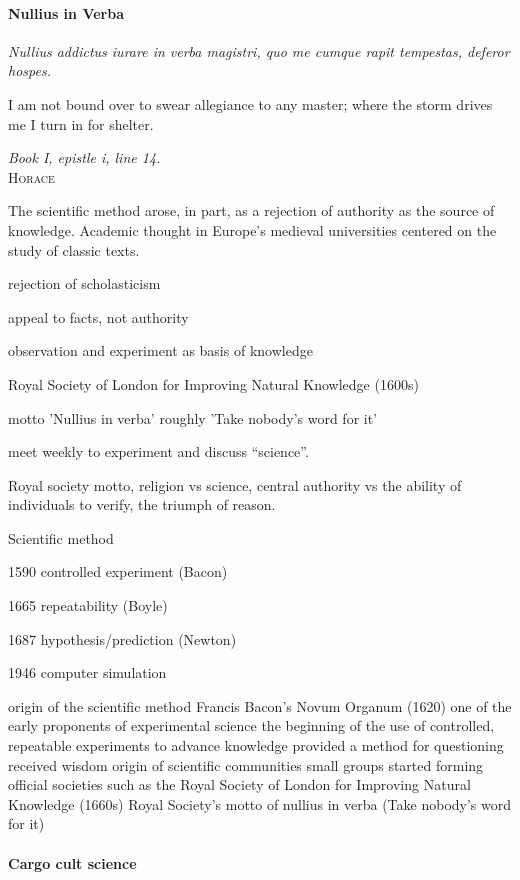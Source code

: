 \documentclass[ChapterTOCs,krantz2]{krantz} %
\begin{document}
\paragraph{ {\bf Nullius in Verba}} 

\setlength{\epigraphrule}{0pt}
\setlength{\epigraphwidth}{.65\textwidth}
\epigraph%
{%
  \emph{Nullius addictus iurare in verba magistri,
  quo me cumque rapit tempestas, deferor hospes.}

  I am not bound over to swear allegiance to any master; where the storm
  drives me I turn in for shelter.
}%
{\textit{Book I, epistle i, line 14.}\\ \textsc{Horace} }

The scientific method arose, in part, as a rejection of authority as
the source of knowledge. Academic thought in Europe's medieval universities
centered on the study of classic texts.

rejection of scholasticism

appeal to facts, not authority

observation and experiment as basis of knowledge

Royal Society of London for Improving Natural Knowledge (1600s)

motto 'Nullius in verba' roughly 'Take nobody's word for it'

meet weekly to experiment and discuss ``science''. 

Royal society motto, religion vs science, central authority vs the
ability of individuals to verify, the triumph of reason.

Scientific method

1590  controlled experiment (Bacon)

1665  repeatability (Boyle)

1687  hypothesis/prediction (Newton)

1946  computer simulation

    origin of the scientific method
        Francis Bacon's Novum Organum (1620) one of the early proponents of experimental science
        the beginning of the use of controlled, repeatable experiments to advance knowledge
        provided a method for questioning received wisdom
    origin of scientific communities
        small groups started forming
        official societies such as the Royal Society of London for Improving Natural Knowledge (1660s)
            Royal Society's motto of nullius in verba (Take nobody's word for it)

\paragraph{ {\bf Cargo cult science}}
\end{document}
